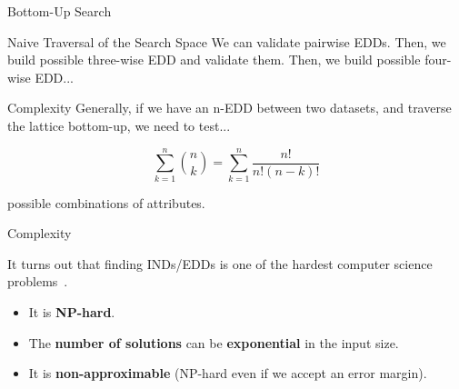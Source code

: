 \documentclass[10pt,notes]{beamer}
\begin{document}
\begin{frame}{Bottom-Up Search}
    \begin{block}{Naive Traversal of the Search Space}
        \smallskip
        We can validate pairwise EDDs. Then, we build possible three-wise EDD and validate them.
        Then, we build possible four-wise EDD...
    \end{block}
        
    \begin{alertblock}{Complexity}
    \smallskip
    Generally, if we have an n-EDD between two datasets, and traverse the lattice bottom-up, we need
    to test...
    
    \begin{equation*}
        \sum_{k=1}^{n}{\binom{n}{k}} = \sum_{k=1}^{n} \frac{n!}{n!(n - k)!}
    \end{equation*}
    
    possible combinations of attributes.
    \end{alertblock}
\end{frame}

\begin{frame}{Complexity}

    It turns out that finding INDs/EDDs is one of the hardest computer science
    problems~\cite{Blsius2017}.
    
    \begin{itemize}
        \item It is \textbf{NP-hard}.
        \item The \textbf{number of solutions} can be \textbf{exponential} in the input size.
        \item It is \textbf{non-approximable} (NP-hard even if we accept an error margin).
    \end{itemize}
    
    \bigskip

\end{frame}
\end{document}
